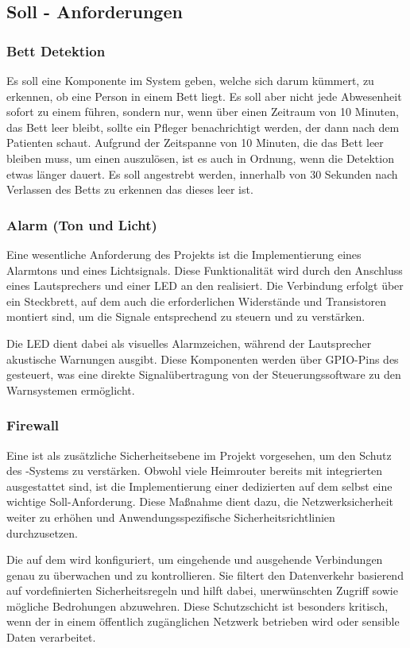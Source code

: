 \subsection{Soll - Anforderungen}

\subsubsection{Bett Detektion}
Es soll eine Komponente im System geben, welche sich darum kümmert, zu erkennen, ob eine Person in einem Bett liegt. Es soll aber nicht jede Abwesenheit sofort zu einem  führen, sondern nur, wenn über einen Zeitraum von 10 Minuten, das Bett leer bleibt, sollte ein Pfleger benachrichtigt werden, der dann nach dem Patienten schaut. Aufgrund der Zeitspanne von 10 Minuten, die das Bett leer bleiben muss, um einen  auszulösen, ist es auch in Ordnung, wenn die Detektion etwas länger dauert. Es soll angestrebt werden, innerhalb von 30 Sekunden nach Verlassen des Betts zu erkennen das dieses leer ist. 

\subsubsection{Alarm (Ton und Licht)}
Eine wesentliche Anforderung des Projekts ist die Implementierung eines Alarmtons und eines Lichtsignals. Diese Funktionalität wird durch den Anschluss eines Lautsprechers und einer LED an den  realisiert. Die Verbindung erfolgt über ein Steckbrett, auf dem auch die erforderlichen Widerstände und Transistoren montiert sind, um die Signale entsprechend zu steuern und zu verstärken.

Die LED dient dabei als visuelles Alarmzeichen, während der Lautsprecher akustische Warnungen ausgibt. Diese Komponenten werden über GPIO-Pins des  gesteuert, was eine direkte Signalübertragung von der Steuerungssoftware zu den Warnsystemen ermöglicht.

\subsubsection{Firewall}
Eine  ist als zusätzliche Sicherheitsebene im Projekt vorgesehen, um den Schutz des -Systems zu verstärken. Obwohl viele Heimrouter bereits mit integrierten  ausgestattet sind, ist die Implementierung einer dedizierten  auf dem  selbst eine wichtige Soll-Anforderung. Diese Maßnahme dient dazu, die Netzwerksicherheit weiter zu erhöhen und Anwendungsspezifische Sicherheitsrichtlinien durchzusetzen.

Die  auf dem  wird konfiguriert, um eingehende und ausgehende Verbindungen genau zu überwachen und zu kontrollieren. Sie filtert den Datenverkehr basierend auf vordefinierten Sicherheitsregeln und hilft dabei, unerwünschten Zugriff sowie mögliche Bedrohungen abzuwehren. Diese Schutzschicht ist besonders kritisch, wenn der  in einem öffentlich zugänglichen Netzwerk betrieben wird oder sensible Daten verarbeitet.
